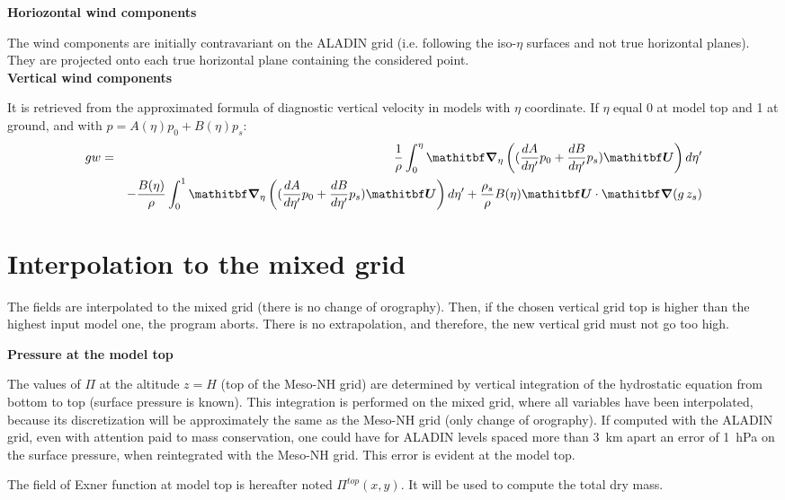 {\bf Horiozontal wind components}

The wind components are initially contravariant on the ALADIN grid
(i.e. following the iso-$\eta$ surfaces and not true horizontal planes).
They are projected onto each true horizontal plane containing the considered
point.\\

{\bf Vertical wind components}

It is retrieved from the approximated formula of diagnostic vertical velocity
in models with $\eta$ coordinate. If $\eta$ equal 0 at model top
and 1 at ground, and with  $p=A(\eta)p_{0}+B(\eta)p_{s}$:
\begin{eqnarray}
gw & = & \frac{1}{\rho}\int^\eta_0\vec{\nabla}_\eta
\l (\frac{dA}{d\eta '}p_0+\frac{dB}{d\eta '}p_{s})\vec{U}\r d\eta ' \nonumber \\
& & -\frac{B(\eta)}{\rho}\int^1_0\vec{\nabla}_\eta
\l(\frac{dA}{d\eta '}p_0+\frac{dB}{d\eta '}p_{s})\vec{U}\r d\eta ' 
+\frac{\rho_{s}}{\rho}B(\eta)\vec{U}\cdot \vec{\nabla}(g\, z_{s}) \nonumber
\end{eqnarray}

\section{Interpolation to the mixed grid}

The fields are interpolated to the mixed grid (there is no
change of orography).
Then, if the chosen vertical grid top is higher than the highest
input model one,
the program aborts. There is no extrapolation, and therefore, the
new vertical grid must not go too high.

{\bf Pressure at the model top}

The values of $\Pi$ at the altitude $z=H$ (top of the Meso-NH grid) are
determined by vertical integration of the hydrostatic equation from bottom
to top (surface pressure is known).
This integration is performed on the mixed grid, where all
variables have been interpolated, because its discretization
will be approximately the same as the Meso-NH grid (only change of orography).
If computed with the ALADIN grid, even with attention paid to mass
conservation, one could have for ALADIN levels spaced more than 3~km apart
an error of 1~hPa on the surface pressure, when reintegrated with the Meso-NH
grid. This error is evident at the model top.

The field of Exner function at model top is hereafter noted
$\Pi^{top}(x,y)$.  It will be used to compute the total dry mass.\\


